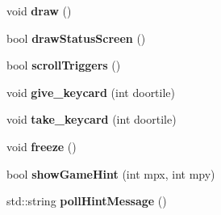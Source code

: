 \begin{DoxyCompactItemize}
\item 
\hypertarget{class_c_player_a68adc8ce8cfa82511f6207541e6c6fd4}{
void {\bfseries draw} ()}
\label{class_c_player_a68adc8ce8cfa82511f6207541e6c6fd4}

\item 
\hypertarget{class_c_player_a8bc182302765b043b5c65ca930384e18}{
bool {\bfseries drawStatusScreen} ()}
\label{class_c_player_a8bc182302765b043b5c65ca930384e18}

\item 
\hypertarget{class_c_player_a6acafaba5c89fc93990e8d3de3b8face}{
bool {\bfseries scrollTriggers} ()}
\label{class_c_player_a6acafaba5c89fc93990e8d3de3b8face}

\item 
\hypertarget{class_c_player_a08c9ce809bf0f07ca14401fbc008f63a}{
void {\bfseries give\_\-keycard} (int doortile)}
\label{class_c_player_a08c9ce809bf0f07ca14401fbc008f63a}

\item 
\hypertarget{class_c_player_ab78141ee23d09eb4b5b2f6707405d3f2}{
void {\bfseries take\_\-keycard} (int doortile)}
\label{class_c_player_ab78141ee23d09eb4b5b2f6707405d3f2}

\item 
\hypertarget{class_c_player_a2e010b87884052189b3feab5c571f3c5}{
void {\bfseries freeze} ()}
\label{class_c_player_a2e010b87884052189b3feab5c571f3c5}

\item 
\hypertarget{class_c_player_acb051c6c30eb3927d3c7b92f66aba170}{
bool {\bfseries showGameHint} (int mpx, int mpy)}
\label{class_c_player_acb051c6c30eb3927d3c7b92f66aba170}

\item 
\hypertarget{class_c_player_a4a71bf139f359edd62b60d5dadf9c684}{
std::string {\bfseries pollHintMessage} ()}
\label{class_c_player_a4a71bf139f359edd62b60d5dadf9c684}

\end{DoxyCompactItemize}

